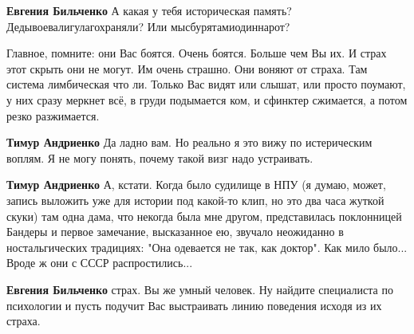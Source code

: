 \begin{itemize}
\begin{itemize}
\textbf{Евгения Бильченко} А какая у тебя историческая память? Дедывоевалигулагохраняли? Или мысбурятамиодиннарот?
\end{itemize}

 

Главное, помните: они Вас боятся. Очень боятся. Больше чем Вы их. И страх этот
скрыть они не могут. Им очень страшно. Они воняют от страха. Там система
лимбическая что ли. Только Вас видят или слышат, или просто поумают, у них
сразу меркнет всё, в груди подымается ком, и сфинктер сжимается, а потом резко
разжимается.

\begin{itemize}
 
\textbf{Тимур Андриенко} Да ладно вам. Но реально я это вижу по истерическим воплям. Я не могу понять, почему такой визг надо устраивать.

 
\textbf{Тимур Андриенко} А, кстати. Когда было судилище в НПУ (я думаю, может, запись выложить уже для истории под какой-то клип, но это два часа жуткой скуки) там одна дама, что некогда была мне другом, представилась поклонницей Бандеры и первое замечание, высказанное ею, звучало неожиданно в ностальгических традициях: "Она одевается не так, как доктор". Как мило было... Вроде ж они с СССР распростились...

 
\textbf{Евгения Бильченко} страх. Вы же умный человек. Ну найдите специалиста по психологии и пусть подучит Вас выстраивать линию поведения исходя из их страха.


\end{itemize}
\end{itemize}
